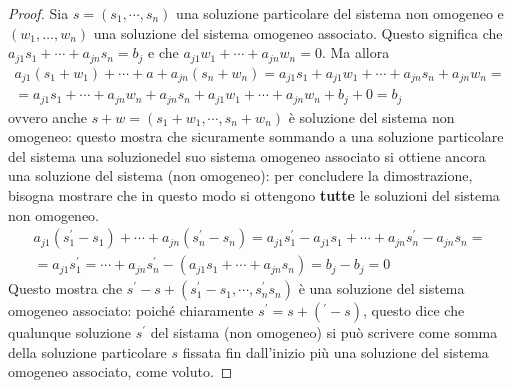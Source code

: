 \documentclass{book}
\theoremstyle{definition}
\theoremstyle{plain}
\begin{document}
\begin{proof}
  Sia $s=(s_1,\cdots, s_n)$ una soluzione particolare del sistema non
  omogeneo e\\ $(w_1,\dots,w_n)$ una soluzione del sistema omogeneo
  associato. Questo significa che $a_{j1}s_1+\cdots+a_{jn}s_n=b_j$ e
  che $a_{j1}w_1+\cdots+a_{jn}w_{n}=0$. Ma allora
  \begin{eqnarray*}
    a_{j1}(s_1+w_1)+\cdots+a+a_{jn}(s_n+w_n)=a_{j1}s_1+a_{j1}w_1+\cdots+a_{jn}s_n+a_{jn}w_n=\\
    =a_{j1}s_1+\cdots+a_{jn}w_n+a_{jn}s_n+a_{j1}w_1+\cdots+a_{jn}w_n+b_j+0=b_j
  \end{eqnarray*}
  ovvero anche $s+w=(s_1+w_1,\cdots,s_n+w_n)$ è soluzione del sistema non
  omogeneo: questo mostra che sicuramente sommando a una soluzione
  particolare del sistema una soluzionedel suo sistema omogeneo associato
  si ottiene ancora una soluzione del sistema (non omogeneo): per concludere
  la dimostrazione, bisogna mostrare che in questo modo si ottengono
  \textbf{tutte} le soluzioni del sistema non omogeneo.
  \begin{eqnarray*}
    a_{j1}(s_1^\prime-s_1)+\cdots+a_{jn}(s_n^\prime-s_n)=a_{j1}s_1^\prime-a_{j1}s_1+\cdots+a_{jn}s_n^\prime
    -a_{jn}s_n=\\
    =a_{j1}s_1^\prime=\cdots+a_{jn}s_n^\prime-(a_{j1}s_1+\cdots+a_{jn}s_n)=b_j-b_j=0
  \end{eqnarray*}
  Questo mostra che $s^\prime-s+(s_1^\prime-s_1,\cdots,s_n^\prime s_n)$ è una
  soluzione del sistema omogeneo associato: poiché chiaramente
  $s^\prime=s+(^\prime-s)$, questo dice che qualunque soluzione $s^\prime$ del
  sistama (non omogeneo) si può scrivere come somma della soluzione particolare
  $s$ fissata fin dall'inizio più una soluzione del sistema omogeneo associato,
  come voluto.
\end{proof}
\end{document}
